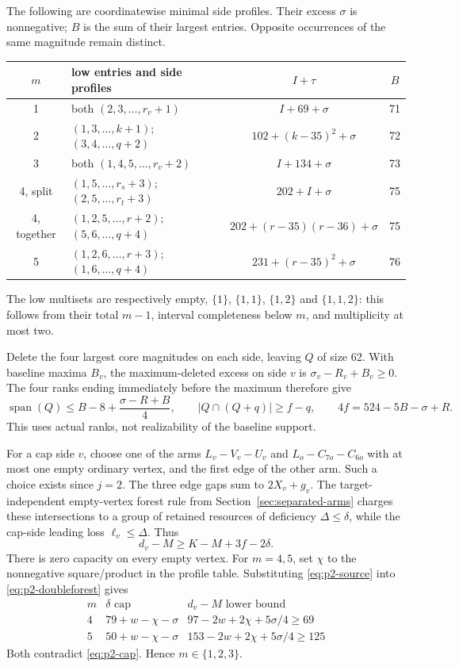 \documentclass[11pt,letterpaper]{article}
\theoremstyle{definition}\newtheorem{definition}[theorem]{Definition}
\begin{document}
The following are coordinatewise minimal side profiles. Their excess
$\sigma$ is nonnegative; $B$ is the sum of their largest entries.
Opposite occurrences of the same magnitude remain distinct.
\begin{center}\small
\begin{tabular}{c|l|c|c}
$m$&low entries and side profiles&$I+\tau$&$B$\\\hline
1&both $(2,3,\ldots,r_v+1)$&$I+69+\sigma$&71\\
2&$(1,3,\ldots,k+1)$; $(3,4,\ldots,q+2)$&$102+(k-35)^2+\sigma$&72\\
3&both $(1,4,5,\ldots,r_v+2)$&$I+134+\sigma$&73\\
4, split&$(1,5,\ldots,r_s+3)$; $(2,5,\ldots,r_t+3)$&$202+I+\sigma$&75\\
4, together&$(1,2,5,\ldots,r+2)$; $(5,6,\ldots,q+4)$&$202+(r-35)(r-36)+\sigma$&75\\
5&$(1,2,6,\ldots,r+3)$; $(1,6,\ldots,q+4)$&$231+(r-35)^2+\sigma$&76
\end{tabular}
\end{center}
The low multisets are respectively empty, $\{1\}$, $\{1,1\}$,
$\{1,2\}$ and $\{1,1,2\}$: this follows from their total $m-1$, interval
completeness below $m$, and multiplicity at most two.

Delete the four largest core magnitudes on each side, leaving $Q$ of
size 62. With baseline maxima $B_v$, the maximum-deleted excess on side
$v$ is $\sigma_v-R_v+B_v\ge0$. The four ranks ending immediately before
the maximum therefore give
\[
 \operatorname{span}(Q)\le B-8+\frac{\sigma-R+B}{4},\qquad
 |Q\cap(Q+q)|\ge f-q,\qquad
 4f=524-5B-\sigma+R.                         \tag{P2-rank}
\]
This uses actual ranks, not realizability of the baseline support.

For a cap side $v$, choose one of the arms
$L_v-V_v-U_v$ and $L_o-C_{7o}-C_{6o}$ with at most one empty ordinary
vertex, and the first edge of the other arm. Such a choice exists since
$j=2$. The three edge gaps sum to $2X_v+g_v$.
The target-independent empty-vertex forest rule from Section~\ref{sec:separated-arms} charges these intersections to a group
of retained resources of deficiency $\Delta\le\delta$, while the cap-side
leading loss $\ell_v\le\Delta$. Thus
\begin{equation}
 d_v-M\ge K-M+3f-2\delta.                 \label{eq:p2-doubleforest}
\end{equation}
There is zero capacity on every empty vertex. For $m=4,5$, set $\chi$ to
the nonnegative square/product in the profile table. Substituting
\eqref{eq:p2-source} into \eqref{eq:p2-doubleforest} gives
\[
 \begin{array}{c|c|c}
 m&\delta\text{ cap}&d_v-M\text{ lower bound}\\\hline
 4&79+w-\chi-\sigma&97-2w+2\chi+5\sigma/4\ge69\\
 5&50+w-\chi-\sigma&153-2w+2\chi+5\sigma/4\ge125
 \end{array}
\]
Both contradict \eqref{eq:p2-cap}. Hence $m\in\{1,2,3\}$.
\end{document}
